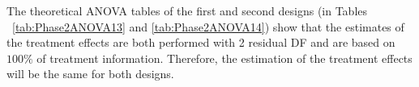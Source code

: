 The theoretical ANOVA tables of the first and second designs (in Tables ~\ref{tab:Phase2ANOVA13} and \ref{tab:Phase2ANOVA14}) show that the estimates of the treatment effects are both performed with 2 residual DF and are based on $100\%$ of treatment information. Therefore, the estimation of the treatment effects will be the same for both designs.


